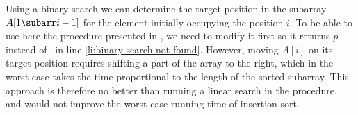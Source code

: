 
\noindent Using a binary search we can determine the target position in the subarray $A[1\subarr i-1]$ for the element initially occupying the position $i$.
To be able to use here the  procedure presented in , we need to modify it first so it returns $p$ instead of \nil\ in line \ref{li:binary-search-not-found}.
However, moving $A[i]$ on its target position requires shifting a part of the array to the right, which in the worst case takes the time proportional to the length of the sorted subarray.
This approach is therefore no better than running a linear search in the  procedure, and would not improve the worst-case running time of insertion sort.
